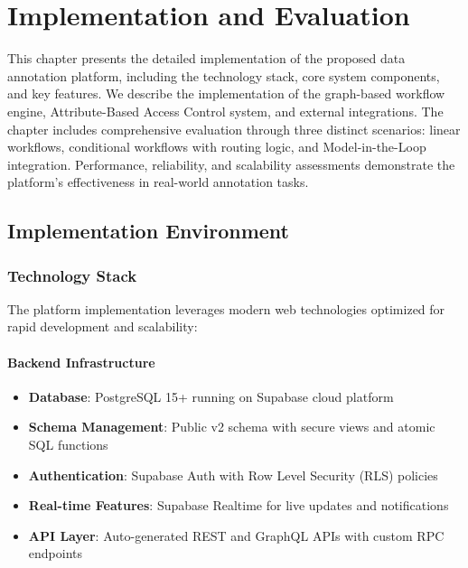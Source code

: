 \chapter{Implementation and Evaluation}
\label{chap:implementation-evaluation}

\begin{ChapAbstract}
This chapter presents the detailed implementation of the proposed data annotation platform, including the technology stack, core system components, and key features. We describe the implementation of the graph-based workflow engine, Attribute-Based Access Control system, and external integrations. The chapter includes comprehensive evaluation through three distinct scenarios: linear workflows, conditional workflows with routing logic, and Model-in-the-Loop integration. Performance, reliability, and scalability assessments demonstrate the platform's effectiveness in real-world annotation tasks.
\end{ChapAbstract}

\section{Implementation Environment}
\label{sec:implementation-environment}

\subsection{Technology Stack}

The platform implementation leverages modern web technologies optimized for rapid development and scalability:

\subsubsection{Backend Infrastructure}
\begin{itemize}
    \item \textbf{Database}: PostgreSQL 15+ running on Supabase cloud platform
    \item \textbf{Schema Management}: Public v2 schema with secure views and atomic SQL functions
    \item \textbf{Authentication}: Supabase Auth with Row Level Security (RLS) policies
    \item \textbf{Real-time Features}: Supabase Realtime for live updates and notifications
    \item \textbf{API Layer}: Auto-generated REST and GraphQL APIs with custom RPC endpoints
\end{itemize}


